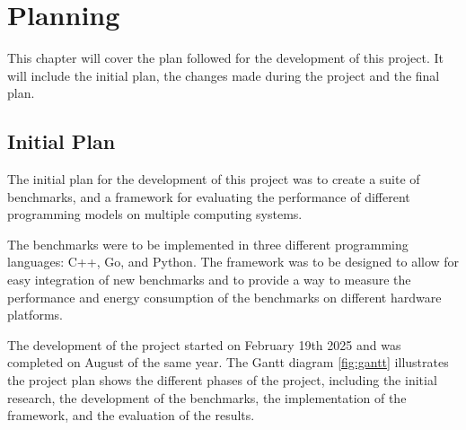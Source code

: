 \chapter{Planning}\label{chap:planning}

This chapter will cover the plan followed for the development of this project. It will include the initial plan, the changes made during the project and the final plan.

\section{Initial Plan}
The initial plan for the development of this project was to create a suite of benchmarks, and a framework for evaluating the performance of different programming models on multiple computing systems. 

The benchmarks were to be implemented in three different programming languages: C++, Go, and Python. The framework was to be designed to allow for easy integration of new benchmarks and to provide a way to measure the performance and energy consumption of the benchmarks on different hardware platforms.

The development of the project started on February 19th 2025 and was completed on August of the same year. The Gantt diagram \ref{fig:gantt} illustrates the project plan shows the different phases of the project, including the initial research, the development of the benchmarks, the implementation of the framework, and the evaluation of the results.

